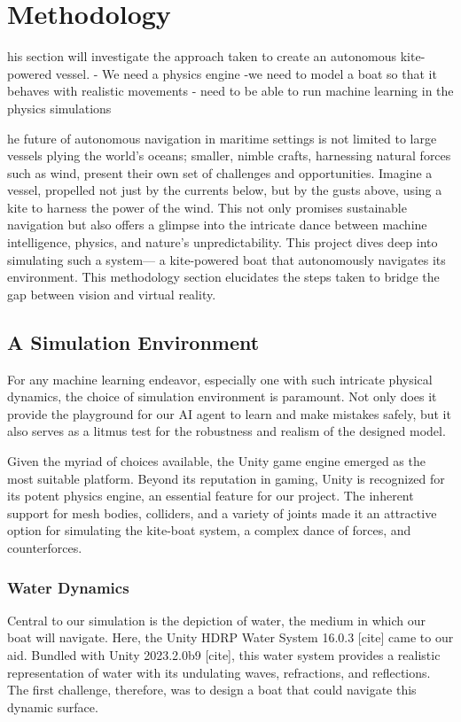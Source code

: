 
%
\let\textcircled=\pgftextcircled
\chapter{Methodology}
\label{chap:aims_and_opjectives}

his section will investigate the approach taken to create an autonomous kite-powered vessel.
- We need a physics engine
-we need to model a boat so that it behaves with realistic movements
- need to be able to run machine learning in the physics simulations

he future of autonomous navigation in maritime settings is not limited to large vessels plying the world's oceans; smaller, nimble crafts, harnessing natural forces such as wind, present their own set of challenges and opportunities. Imagine a vessel, propelled not just by the currents below, but by the gusts above, using a kite to harness the power of the wind. This not only promises sustainable navigation but also offers a glimpse into the intricate dance between machine intelligence, physics, and nature's unpredictability. This project dives deep into simulating such a system— a kite-powered boat that autonomously navigates its environment. This methodology section elucidates the steps taken to bridge the gap between vision and virtual reality.

\section{A Simulation Environment}
For any machine learning endeavor, especially one with such intricate physical dynamics, the choice of simulation environment is paramount. Not only does it provide the playground for our AI agent to learn and make mistakes safely, but it also serves as a litmus test for the robustness and realism of the designed model.

Given the myriad of choices available, the Unity game engine emerged as the most suitable platform. Beyond its reputation in gaming, Unity is recognized for its potent physics engine, an essential feature for our project. The inherent support for mesh bodies, colliders, and a variety of joints made it an attractive option for simulating the kite-boat system, a complex dance of forces, and counterforces.

\subsection{Water Dynamics}
Central to our simulation is the depiction of water, the medium in which our boat will navigate. Here, the Unity HDRP Water System 16.0.3 [cite] came to our aid. Bundled with Unity 2023.2.0b9 [cite], this water system provides a realistic representation of water with its undulating waves, refractions, and reflections. The first challenge, therefore, was to design a boat that could navigate this dynamic surface.

